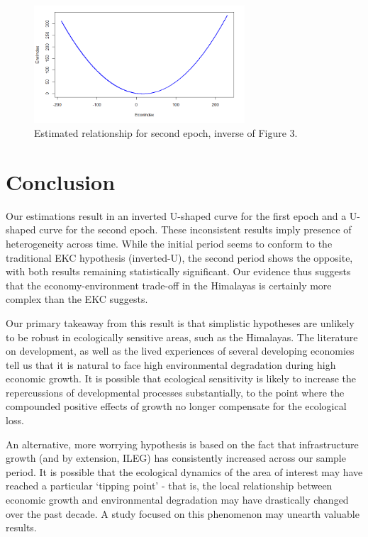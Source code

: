 \documentclass[a4paper,12pt]{article}
\begin{document}
\begin{figure}[h]
    \centering
    \includegraphics[width=0.7\textwidth]{images/notkuznets.png}
    \caption{Estimated relationship for second epoch, inverse of Figure 3.}
    \label{fig:epoch2}
\end{figure}


\section{Conclusion}

Our estimations result in an inverted U-shaped curve for the first epoch and a U-shaped curve for the second epoch. These inconsistent results imply presence of heterogeneity across time. While the initial period seems to conform to the traditional EKC hypothesis (inverted-U), the second period shows the opposite, with both results remaining statistically significant. Our evidence thus suggests that the economy-environment trade-off in the Himalayas is certainly more complex than the EKC suggests. 

Our primary takeaway from this result is that simplistic hypotheses are unlikely to be robust in ecologically sensitive areas, such as the Himalayas. The literature on development, as well as the lived experiences of several developing economies tell us that it is natural to face high environmental degradation during high economic growth. It is possible that ecological sensitivity is likely to increase the repercussions of developmental processes substantially, to the point where the compounded positive effects of growth no longer compensate for the ecological loss. 

An alternative, more worrying hypothesis is based on the fact that infrastructure growth (and by extension, ILEG) has consistently increased across our sample period. It is possible that the ecological dynamics of the area of interest may have reached a particular ‘tipping point’ - that is, the local relationship between economic growth and environmental degradation may have drastically changed over the past decade. A study focused on this phenomenon may unearth valuable results.
\end{document}
